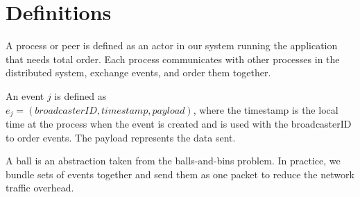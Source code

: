 \section{Definitions}
\label{sec:definitions}
A process or peer is defined as an actor in our system running the application that needs total order. Each process communicates with other processes in the distributed system, exchange events, and order them together. 
\par
An event $j$ is defined as \\$e_j=(broadcasterID,timestamp,payload)$, where the timestamp is the local time at the process when the event is created and is used with the broadcasterID to order events. The payload represents the data sent. %
\par
A ball is an abstraction taken from the balls-and-bins problem. In practice, we bundle sets of events together and send them as one packet to reduce the network traffic overhead.  


